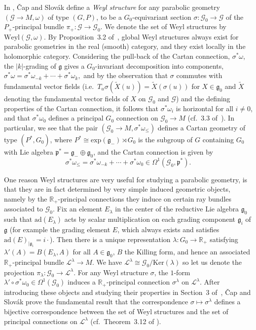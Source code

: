 \documentclass[pdftex]{sigma}
\def\R{\mathbb{R}}
\def\g{\mathfrak{g}}
\def\p{\mathfrak{p}}
\def\Gbdle{\mathcal{G}}
\def\dsum{\oplus}
\def\isom{\cong}
\theoremstyle{plain}
\theoremstyle{definition}
\begin{document}
In \cite{CS03}, \v{C}ap and Slov\'ak def\/ine a \emph{Weyl structure} for any parabolic geometry $(\Gbdle \rightarrow M,\omega)$ of type $(G,P)$, to be a $G_0$-equivariant section $\sigma: \Gbdle_0 \rightarrow \Gbdle$ of the $P_+$-principal bundle $\pi_+:\Gbdle \rightarrow \Gbdle_0$. We denote the set of Weyl structures by $\mathrm{Weyl}(\Gbdle,\omega)$. By Proposition~3.2 of~\cite{CS03}, global Weyl structures always exist for parabolic geometries in the real (smooth) category, and they exist locally in the holomorphic category. Considering the pull-back of the Cartan connection, $\sigma^*\omega$, the $\vert k \vert$-grading of $\g$ gives a $G_0$-invariant decomposition into components, $\sigma^*\omega = \sigma^*\omega_{-k} + \cdots + \sigma^*\omega_k,$ and by the observation that $\sigma$ commutes with fundamental vector f\/ields (i.e.\ $T_u\sigma(\widetilde{X}(u)) = \widetilde{X}(\sigma(u))$ for $X \in \g_0$ and $\widetilde{X}$ denoting the fundamental vector f\/ields of $X$ on $\Gbdle_0$ and $\Gbdle$) and the def\/ining properties of the Cartan connection, it follows that $\sigma^*\omega_i$ is horizontal for all $i \neq 0$, and that $\sigma^*\omega_0$ def\/ines a principal $G_0$ connection on $\Gbdle_0 \rightarrow M$ (cf.~3.3 of~\cite{CS03}). In particular, we see that the pair $(\Gbdle_0 \rightarrow M,\sigma^*\omega_{\leq})$ def\/ines a Cartan geometry of type $(P^*,G_0)$, where $P^* \isom \mathrm{exp}(\g_-) \rtimes G_0$ is the subgroup of $G$ containing $G_0$ with Lie algebra $\p^* = \g_- \dsum \g_0$, and the Cartan connection is given by
\[
\sigma^*\omega_{\leq} = \sigma^*\omega_{-k} + \cdots + \sigma^*\omega_0 \in \Omega^1(\Gbdle_0,\p^*).
\]

One reason Weyl structures are very useful for studying a parabolic geometry, is that they are in fact determined by very simple induced geometric objects, namely by the $\R_+$-principal connections they induce on certain ray bundles associated to $\Gbdle_0$. Fix an element $E_{\lambda}$ in the center of the reductive Lie algebra $\g_0$ such that $\mathrm{ad}(E_{\lambda})$ acts by scalar multiplication on each grading component $\g_i$ of $\g$ (for example the grading element $E$, which always exists and satisf\/ies $\mathrm{ad}(E)_{\vert \g_i} = i \cdot$). Then there is a unique representation $\lambda: G_0 \rightarrow \R_+$ satisfying $\lambda'(A) = B(E_{\lambda},A)$ for all $A \in \g_0$, $B$ the Killing form, and hence an associated $\R_+$-principal bundle $\mathcal{L}^{\lambda} \rightarrow M$. We have $\mathcal{L}^{\lambda} \isom \Gbdle_0/\mathrm{Ker}(\lambda)$ so let us denote the projection $\pi_{\lambda}: \Gbdle_0 \rightarrow \mathcal{L}^{\lambda}$. For any Weyl structure $\sigma$, the $1$-form $\lambda' \circ \sigma^*\omega_0 \in \Omega^1(\Gbdle_0)$ induces a $\R_+$-principal connection $\sigma^{\lambda}$ on $\mathcal{L}^{\lambda}$. After introducing these objects and studying their properties in Section~3 of~\cite{CS03}, \v{C}ap and Slov\'ak prove the fundamental result that the correspondence $\sigma \mapsto \sigma^{\lambda}$ def\/ines a bijective correspondence between the set of Weyl structures and the set of principal connections on $\mathcal{L}^{\lambda}$ (cf.\ Theorem~3.12 of \cite{CS03}).
\end{document}

